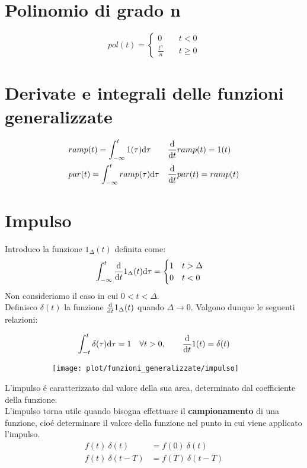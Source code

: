 \documentclass[../main.tex]{subfiles}
\begin{document}
	\section{Polinomio di grado n}
	\[
		pol(t)=
		\begin{cases}
			0 \quad &t<0\\
			\frac{t^n}{n} \quad &t\geq 0
		\end{cases}
	\]
	\section{Derivate e integrali delle funzioni generalizzate}
	\begin{align*}
		&ramp(t) = \int_{- \infty}^{t} 1(\tau) \mathrm{d}\tau &&\frac{\mathrm{d} }{\mathrm{d} t} ramp(t) = 1(t)\\
		&par(t) = \int_{- \infty}^{t} ramp(\tau) \mathrm{d} \tau &&\frac{\mathrm{d} }{\mathrm{d} t} par(t) = ramp(t)	
	\end{align*}
	\section{Impulso}
	Introduco la funzione $1_{\Delta}(t)$ definita come:
	\[
		\int_{- \infty}^{t} \frac{\mathrm{d} }{\mathrm{d} t}1_{\Delta}(t) \mathrm{d}\tau=
		\begin{cases}
			1 \quad t>\Delta\\
			0 \quad t<0
		\end{cases}
	\]
	Non consideriamo il caso in cui $0<t<\Delta$.\\
	\linebreak
	Definisco $\delta(t)$ la funzione $\frac{\mathrm{d} }{\mathrm{d} t}1_{\Delta}(t)$ quando $\Delta \longrightarrow 0$. Valgono dunque le seguenti relazioni: 
	\begin{figure}[h!]
		\centering
		\begin{subfigure}{0.5\textwidth}
			\[
			\int_{-t}^{t} \delta(\tau) \mathrm{d}\tau =1 \quad \forall t>0, \qquad \frac{\mathrm{d} }{\mathrm{d} t} 1(t) = \delta(t)
			\]
		\end{subfigure}
		\begin{subfigure}{0.4\textwidth}
			\texttt{[image: plot/funzioni\_generalizzate/impulso]}
		\end{subfigure}
	\end{figure}
	\linebreak
	L'impulso \'e caratterizzato dal valore della sua area, determinato dal coefficiente della funzione.\\
	\linebreak
	L'impulso torna utile quando bisogna effettuare il \textbf{campionamento} di una funzione, cio\'e determinare il valore della funzione nel punto in cui viene applicato l'impulso.
	\begin{align*}
		f(t)\ \delta(t) &= f(0)\ \delta(t)\\
		f(t)\ \delta(t - T) &= f(T)\ \delta(t - T)   
	\end{align*}
\end{document}
